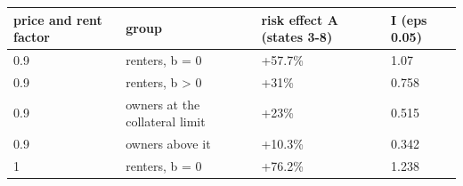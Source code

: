 \begingroup\small
\setlength{\tabcolsep}{3pt}
\renewcommand{\arraystretch}{1.04}
\begin{tabularx}{\linewidth}{XXXX}
\toprule
price and rent factor & group & risk effect A (states 3-8) & I (eps 0.05) \\
\midrule
0.9 & renters, b = 0 & +57.7\% & 1.07 \\
0.9 & renters, b \textgreater{} 0 & +31\% & 0.758 \\
0.9 & owners at the collateral limit & +23\% & 0.515 \\
0.9 & owners above it & +10.3\% & 0.342 \\
1 & renters, b = 0 & +76.2\% & 1.238 \\
\bottomrule
\end{tabularx}
\endgroup
